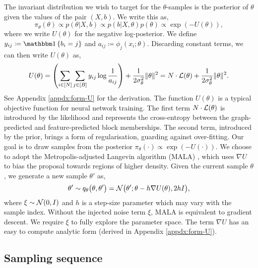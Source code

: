 The invariant distribution we wish to target for the $\theta$-samples is the posterior of $\theta$ given the values of the pair $(X, b)$. 
We write this as,
%
\begin{equation}
	\pi_\theta(\theta) \propto p(\theta | X, b) \propto p(b | X, \theta) p(\theta) \propto  \exp \left( - U(\theta) \right),
	\label{eq:U}
\end{equation}
%
where we write $U(\theta)$ for the negative log-posterior. We define $y_{ij} \coloneqq \one \left\{ b_i = j \right\}$ and $a_{ij} \coloneqq \phi_j(x_i; \theta)$. 
Discarding constant terms, we can then write $U(\theta)$ as,
%
\begin{equation}
	U(\theta) = \left( \sum_{i \in [N]} \sum_{j \in [B]} y_{ij} \log \frac{1}{a_{ij}} \right)
	+ \frac{1}{2\sigma_\theta^2} \|\theta\|^2 = N \cdot \mathcal{L}(\theta) + \frac{1}{2\sigma_\theta^2} \|\theta\|^2.
	\label{eqn:U-form}
\end{equation}
%
See Appendix \ref{appdx:form-U} for the derivation. The function $U(\theta)$ is a typical objective function for neural network training. The first term $N \cdot \mathcal{L}(\theta)$ is introduced by the likelihood and represents the cross-entropy between the graph-predicted and feature-predicted block memberships. 
The second term, introduced by the prior, brings a form of regularisation, guarding against over-fitting. Our goal is to draw samples from the posterior $\pi_\theta(\cdot) \propto \exp(-U(\cdot))$. We choose to adopt the Metropolis-adjusted Langevin algorithm (MALA) \cite{mala-tweedie}, which uses $\nabla U$ to bias the proposal towards regions of higher density. Given the current sample $\theta$, we generate 
a new sample $\theta'$ as,
%
\begin{equation*}
	\theta' \sim q_\theta\big(\theta, \theta'\big) 
	= \mathcal{N} \big( \theta' ; \theta - h \nabla U(\theta), 2h I \big),
\end{equation*}
%
where $\xi \sim \mathcal{N}(0, I)$ and $h$ is a step-size parameter 
which may vary with the sample index.
Without the injected noise term $\xi$, MALA is equivalent to gradient descent. We require $\xi$ to fully explore the parameter space. 
The term $\nabla U$ has an easy to compute analytic form (derived in Appendix \ref{appdx:form-U}).

\subsection{Sampling sequence}
\label{s:ss}


